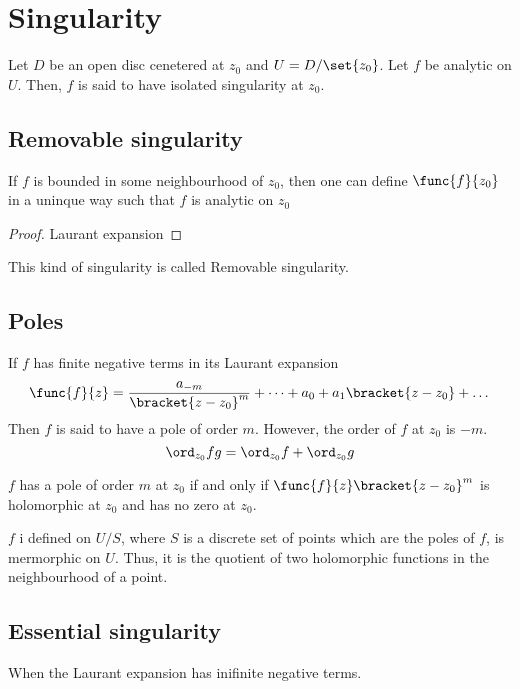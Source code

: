 \section{Singularity}
Let \(D\) be an open disc cenetered at \(z_0\) and \(U = D/\set{z_0}\). Let \(f\) be analytic on \(U\). Then, \(f\) is said to have isolated singularity at \(z_0\). 
\subsection{Removable singularity}
\begin{theorem}
    If \(f\) is bounded in some neighbourhood of \(z_0\), then one can define \(\func{f}{z_0}\) in a uninque way such that \(f\) is analytic on \(z_0\)
\end{theorem}
\begin{proof}
    Laurant expansion
\end{proof}
This kind of singularity is called Removable singularity.
\subsection{Poles}
If \(f\) has finite negative terms in its Laurant expansion 
\begin{equation*}
    \func{f}{z} = \dfrac{a_{-m}}{\bracket{z - z_0}^m} + \dots + a_0 + a_1 \bracket{z - z_0} + \dots 
\end{equation*}
Then \(f \) is said to have a pole of order \(m\). However, the order of \(f\) at \(z_0\) is \(-m\). 
\begin{equation*}
    \ord_{z_0} fg = \ord_{z_0} f + \ord_{z_0} g
\end{equation*}

\begin{proposition}
    \(f\) has a pole of order \(m\) at \(z_0\) if and only if \(\func{f}{z} \bracket{z - z_0}^m\) is holomorphic at \(z_0\) and has no zero at \(z_0\).
\end{proposition}

\begin{definition}
    \(f\) i defined on \(U/S\), where \(S\) is a discrete set of points which are the poles of \(f\), is mermorphic on \(U\). Thus, it is the quotient of two holomorphic functions in the neighbourhood of a point.
\end{definition}

\subsection{Essential singularity}
When the Laurant expansion has inifinite negative terms. 

